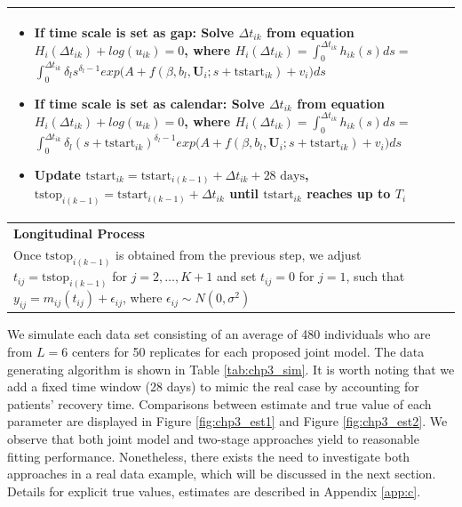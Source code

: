 \begin{table}[H]
\begin{tabular}{p{14cm}}
\begin{enumerate}
\begin{itemize}
                \item If time scale is set as gap: Solve $\Delta t_{ik}$ from equation $H_i(\Delta t_{ik})+log(u_{ik})=0$, where $H_i(\Delta t_{ik})=\int_{0}^{\Delta t_{ik}}h_{ik}(s)ds=$
               $\int_{0}^{\Delta t_{ik}}\delta_l s^{\delta_l-1}exp\big(A+f(\beta,b_l,\bm{U}_i;s+\mbox{tstart}_{ik})+v_i\big)ds$
                \item If time scale is set as calendar: Solve $\Delta t_{ik}$ from equation $H_i(\Delta t_{ik})+log(u_{ik})=0$, where $H_i(\Delta t_{ik})=\int_{0}^{\Delta t_{ik}}h_{ik}(s)ds=$ 
               $\int_{0}^{\Delta t_{ik}}\delta_l (s+\mbox{tstart}_{ik})^{\delta_l-1}exp\big(A+f(\beta,b_l,\bm{U}_i;s+\mbox{tstart}_{ik})+v_i\big)ds$
             \item Update $\mbox{tstart}_{ik}=\mbox{tstart}_{i(k-1)}+\Delta t_{ik}+ \mbox{28 days}$, $\mbox{tstop}_{i(k-1)}=\mbox{tstart}_{i(k-1)}+\Delta t_{ik}$ until $\mbox{tstart}_{ik}$ reaches up to $T_i$
            \end{itemize}
    \end{enumerate}\\
      \midrule 
   \textbf{Longitudinal Process}\\ 
    Once $\mbox{tstop}_{i(k-1)}$ is obtained from the previous step, we adjust $t_{ij}=\mbox{tstop}_{i(k-1)}$ for $j=2,\dots,K+1$ and set $t_{ij}=0$ for $j=1$, such that $y_{ij}=m_{ij}(t_{ij})+\epsilon_{ij}$,
  where $\epsilon_{ij} \sim N(0,\sigma^2)$\\
      \bottomrule
\end{tabular}
\end{table}

We simulate each data set consisting of an average of 480 individuals who are from $L=6$ centers for 50 replicates for each proposed joint model. The data generating algorithm is shown in Table \ref{tab:chp3_sim}. It is worth noting that we add a fixed time window (28 days) to mimic the real case by accounting for patients' recovery time. Comparisons between estimate and true value of each parameter are displayed in Figure \ref{fig:chp3_est1} and Figure \ref{fig:chp3_est2}. We observe that both joint model and two-stage approaches yield to reasonable fitting performance. Nonetheless, there exists the need to investigate both approaches in a real data example, which will be discussed in the next section. Details for explicit true values, estimates are described in Appendix \ref{app:c}.  

